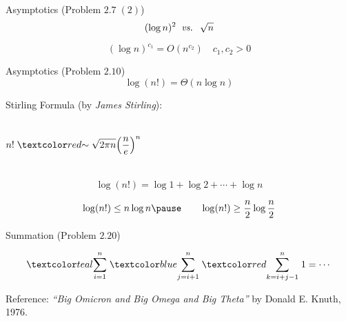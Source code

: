 \begin{frame}{}
  \begin{exampleblock}{Asymptotics (Problem $2.7\; (2)$)}
    \[
      (\log n)^{2} \;\;\text{\it vs. }\; \sqrt{n}
    \]
  \end{exampleblock}

  \pause
  \[
    (\log n)^{c_1} = O(n^{c_2}) \quad c_1, c_2 > 0
  \]
\end{frame}

\begin{frame}{}
  \begin{exampleblock}{Asymptotics (Problem $2.10$)}
    \[
      \log(n!) = \Theta(n \log n)
    \]
  \end{exampleblock}

  \pause
  \vspace{0.30cm}
  \begin{alertblock}{Stirling Formula (by {\it James Stirling}):}
    \begin{columns}
	\[
	  n! \;\red{\sim}\; \sqrt{2 \pi n} \Big(\frac{n}{e}\Big)^{n}
	\]
    \end{columns}
  \end{alertblock}

  \pause
  \vspace{0.30cm}
  \[
    \log (n!) = \log 1 + \log 2 + \cdots + \log n
  \]

  \pause
  \[
    \log (n!) \le n \log n \pause \qquad \log (n!) \ge \frac{n}{2} \log \frac{n}{2}
  \]
\end{frame}

\begin{frame}{}
  \begin{exampleblock}{Summation (Problem $2.20$)}
    
  \end{exampleblock}

  \pause
  \[
    \teal{\sum_{i=1}^{n}}\; \blue{\sum_{j=i+1}^{n}}\; \red{\sum_{k=i+j-1}^{n}}\; 1 = \cdots %
  \]
\end{frame}

\begin{frame}{}

  \begin{alertblock}{Reference:}
    {\it ``Big Omicron and Big Omega and Big Theta''} by Donald E. Knuth, 1976.
  \end{alertblock}
\end{frame}
